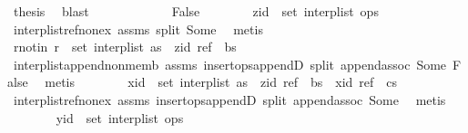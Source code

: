 \begin{isabellebody}
\ {\isacharquery}thesis\ \isamarkupfalse%
\ blast\isanewline
\ \ \ \ \isamarkupfalse%
\isanewline
\ \ \ \ \ \ \isamarkupfalse%
\ False\isanewline
\ \ \ \ \ \ \isamarkupfalse%
\ {\isachardoublequoteopen}zid\ {\isasymnotin}\ set\ {\isacharparenleft}interp{\isacharunderscore}list\ ops{\isacharparenright}{\isachardoublequoteclose}\isanewline
\ \ \ \ \ \ \ \ \isamarkupfalse%
\ interp{\isacharunderscore}list{\isacharunderscore}ref{\isacharunderscore}nonex\ assms{\isacharparenleft}{}{\isacharparenright}\ split\ Some\ \isamarkupfalse%
\ metis\isanewline
\ \ \ \ \ \ \isamarkupfalse%
\ \isamarkupfalse%
\ r{\isacharunderscore}notin{\isacharcolon}\ {\isachardoublequoteopen}r\ {\isasymnotin}\ set\ {\isacharparenleft}interp{\isacharunderscore}list\ {\isacharparenleft}as\ {\isacharat}\ {\isacharbrackleft}{\isacharparenleft}zid{\isacharcomma}\ ref{\isacharparenright}{\isacharbrackright}\ {\isacharat}\ bs{\isacharparenright}{\isacharparenright}{\isachardoublequoteclose}\isanewline
\ \ \ \ \ \ \ \ \isamarkupfalse%
\ interp{\isacharunderscore}list{\isacharunderscore}append{\isacharunderscore}non{\isacharunderscore}memb\ assms{\isacharparenleft}{}{\isacharparenright}\ insert{\isacharunderscore}ops{\isacharunderscore}appendD\ split\ append{\isachardot}assoc\ Some\ False\ \isamarkupfalse%
\ metis\isanewline
\ \ \ \ \ \ \isamarkupfalse%
\ {\isachardoublequoteopen}xid\ {\isasymnotin}\ set\ {\isacharparenleft}interp{\isacharunderscore}list\ {\isacharparenleft}as\ {\isacharat}\ {\isacharbrackleft}{\isacharparenleft}zid{\isacharcomma}\ ref{\isacharparenright}{\isacharbrackright}\ {\isacharat}\ bs\ {\isacharat}\ {\isacharbrackleft}{\isacharparenleft}xid{\isacharcomma}\ ref{\isacharparenright}{\isacharbrackright}\ {\isacharat}\ cs{\isacharparenright}{\isacharparenright}{\isachardoublequoteclose}\isanewline
\ \ \ \ \ \ \ \ \isamarkupfalse%
\ interp{\isacharunderscore}list{\isacharunderscore}ref{\isacharunderscore}nonex\ assms{\isacharparenleft}{}{\isacharparenright}\ insert{\isacharunderscore}ops{\isacharunderscore}appendD\ split\ append{\isachardot}assoc\ Some\ \isamarkupfalse%
\ metis\isanewline
\ \ \ \ \ \ \isamarkupfalse%
\ {\isachardoublequoteopen}yid\ {\isasymnotin}\ set\ {\isacharparenleft}interp{\isacharunderscore}list\ ops{\isacharparenright}{\isachardoublequoteclose}\isanewline
\ \ \ \ \ \ \ \ \isamarkupfalse%

\end{isabellebody}
